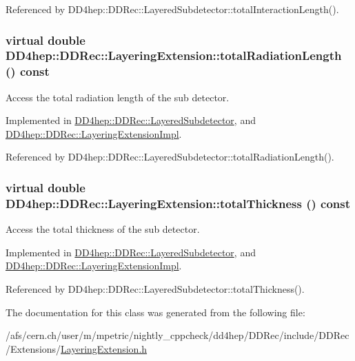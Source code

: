 Referenced by DD4hep::DDRec::LayeredSubdetector::totalInteractionLength().\hypertarget{class_d_d4hep_1_1_d_d_rec_1_1_layering_extension_a710dca345926458ed3ab3abc06490ee9}{
\subsubsection[{totalRadiationLength}]{\setlength{\rightskip}{0pt plus 5cm}virtual double DD4hep::DDRec::LayeringExtension::totalRadiationLength () const}}
\label{class_d_d4hep_1_1_d_d_rec_1_1_layering_extension_a710dca345926458ed3ab3abc06490ee9}


Access the total radiation length of the sub detector. 

Implemented in \hyperlink{class_d_d4hep_1_1_d_d_rec_1_1_layered_subdetector_ae33ee0ed3dc3c41b7449e950176d37c2}{DD4hep::DDRec::LayeredSubdetector}, and \hyperlink{class_d_d4hep_1_1_d_d_rec_1_1_layering_extension_impl_a220aae6042be5005f3f51367cee0a314}{DD4hep::DDRec::LayeringExtensionImpl}.

Referenced by DD4hep::DDRec::LayeredSubdetector::totalRadiationLength().\hypertarget{class_d_d4hep_1_1_d_d_rec_1_1_layering_extension_a287dd58b108f5d121bc55c91009454ed}{
\subsubsection[{totalThickness}]{\setlength{\rightskip}{0pt plus 5cm}virtual double DD4hep::DDRec::LayeringExtension::totalThickness () const}}
\label{class_d_d4hep_1_1_d_d_rec_1_1_layering_extension_a287dd58b108f5d121bc55c91009454ed}


Access the total thickness of the sub detector. 

Implemented in \hyperlink{class_d_d4hep_1_1_d_d_rec_1_1_layered_subdetector_a3bfdb0cc2f8b907fe8fb505b778db042}{DD4hep::DDRec::LayeredSubdetector}, and \hyperlink{class_d_d4hep_1_1_d_d_rec_1_1_layering_extension_impl_ae245b5a3f6ff14a5c6ab521219695a87}{DD4hep::DDRec::LayeringExtensionImpl}.

Referenced by DD4hep::DDRec::LayeredSubdetector::totalThickness().

The documentation for this class was generated from the following file:\begin{DoxyCompactItemize}
\item 
/afs/cern.ch/user/m/mpetric/nightly\_\-cppcheck/dd4hep/DDRec/include/DDRec/Extensions/\hyperlink{_layering_extension_8h}{LayeringExtension.h}\end{DoxyCompactItemize}
